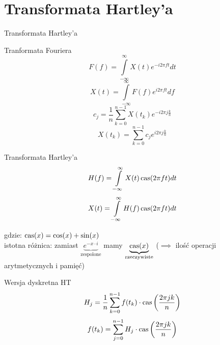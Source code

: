 \section{Transformata Hartley'a}
\begin{frame}[allowframebreaks]{Transformata Hartley'a}
	\begin{block}{Tranformata Fouriera}
	\[
		F(f) = \int\limits_{-\infty}^{\infty} X(t) e^{-i2\pi ft} dt
	\]
	\[
		X(t) = \int\limits_{-\infty}^{\infty} F(f) e^{i2\pi ft} df
	\]
	\[
		c_j = \frac{1}{n} \sum\limits_{k = 0}^{n-1} X(t_k) e^{-i2\pi j \frac{k}{n}}
	\]
	\[
		X(t_k) = \sum\limits_{k = 0}^{n-1} c_j e^{i2\pi j \frac{k}{n}}
	\]
	\end{block}
	\begin{block}{Transformata Hartley'a}
	\[
		H(f) = \int\limits_{-\infty}^{\infty} X(t) \operatorname{cas}(2\pi ft) dt
	\]
	\[
	X(t) = \int\limits_{-\infty}^{\infty} H(f) \operatorname{cas}(2\pi ft) dt
	\]
	\end{block}
	gdzie: $\operatorname{cas}(x) = \cos(x) + \sin(x)$\\
	istotna różnica: zamiast $\underbrace{e^{-x \cdot i}}_{\text{zespolone}}$ mamy $\underbrace{\operatorname{cas}(x)}_{\text{rzeczywiste}}$ ($\implies$ ilość operacji arytmetycznych i pamięć)
	\begin{block}{Wersja dyskretna HT}
	\[
		H_j = \frac{1}{n} \sum\limits_{k = 0}^{n-1} f(t_k) \cdot \operatorname{cas} \bigg( \frac{2\pi jk}{n} \bigg)
	\]
	\[
		f(t_k) = \sum\limits_{j=0}^{n-1} H_j \cdot \operatorname{cas} \bigg( \frac{2\pi jk}{n} \bigg)
	\]
	\end{block}
\end{frame}
